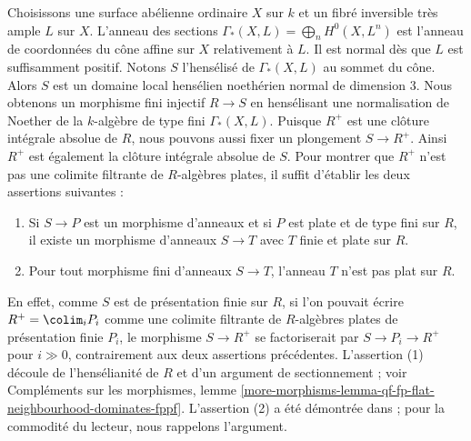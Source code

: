 \medskip\noindent
Choisissons une surface abélienne ordinaire $X$ sur $k$ et un fibré inversible très ample $L$ sur $X$. L'anneau des sections
$\Gamma_*(X, L) = \bigoplus_n H^0(X,L^n)$ est l'anneau de coordonnées du cône affine sur $X$ relativement à $L$. Il est normal dès que $L$
est suffisamment positif. Notons $S$ l'hensélisé de $\Gamma_*(X, L)$
au sommet du cône. Alors $S$ est un domaine local hensélien noethérien
normal de dimension $3$. Nous obtenons un morphisme fini injectif
$R \to S$ en hensélisant une normalisation de Noether de la $k$-algèbre de type fini $\Gamma_*(X, L)$. Puisque $R^+$ est une
clôture intégrale absolue de $R$, nous pouvons aussi fixer un plongement
$S \to R^+$. Ainsi $R^+$ est également la clôture intégrale absolue de $S$.
Pour montrer que $R^+$ n'est pas une colimite filtrante de $R$-algèbres plates, il suffit d'établir les deux assertions suivantes :
\begin{enumerate}
\item Si $S \to P$ est un morphisme d'anneaux et si $P$ est plate et
de type fini sur $R$, il existe un morphisme d'anneaux $S \to T$ avec
$T$ finie et plate sur $R$.
\item Pour tout morphisme fini d'anneaux $S \to T$, l'anneau $T$
n'est pas plat sur $R$.
\end{enumerate}
En effet, comme $S$ est de présentation finie sur $R$, si l'on pouvait écrire
$R^+ = \colim_i P_i$ comme une colimite filtrante de $R$-algèbres plates
de présentation finie $P_i$, le morphisme $S \to R^+$ se factoriserait
par $S \to P_i \to R^+$ pour $i \gg 0$, contrairement aux deux assertions
précédentes. L'assertion (1) découle de l'hensélianité de $R$ et d'un
argument de sectionnement ; voir Compléments sur les morphismes, lemme
\ref{more-morphisms-lemma-qf-fp-flat-neighbourhood-dominates-fppf}.
L'assertion (2) a été démontrée dans \cite{BhattSmallCMMod} ; pour la
commodité du lecteur, nous rappelons l'argument.

